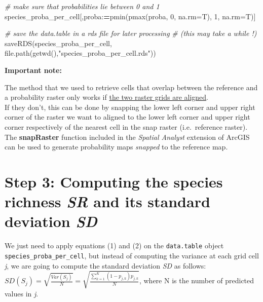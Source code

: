 \documentclass[
]{article}
\newenvironment{Shaded}{\begin{snugshade}}{\end{snugshade}}
\newcommand{\AttributeTok}[1]{\textcolor[rgb]{0.77,0.63,0.00}{#1}}
\newcommand{\CommentTok}[1]{\textcolor[rgb]{0.56,0.35,0.01}{\textit{#1}}}
\newcommand{\DecValTok}[1]{\textcolor[rgb]{0.00,0.00,0.81}{#1}}
\newcommand{\ErrorTok}[1]{\textcolor[rgb]{0.64,0.00,0.00}{\textbf{#1}}}
\newcommand{\FunctionTok}[1]{\textcolor[rgb]{0.00,0.00,0.00}{#1}}
\newcommand{\NormalTok}[1]{#1}
\newcommand{\SpecialCharTok}[1]{\textcolor[rgb]{0.00,0.00,0.00}{#1}}
\newcommand{\StringTok}[1]{\textcolor[rgb]{0.31,0.60,0.02}{#1}}
\begin{document}
\begin{Shaded}
\begin{Highlighting}[]
\CommentTok{\# make sure that probabilities lie between 0 and 1}
\NormalTok{species\_proba\_per\_cell[,proba}\SpecialCharTok{:}\ErrorTok{=}\FunctionTok{pmin}\NormalTok{(}\FunctionTok{pmax}\NormalTok{(proba, }\DecValTok{0}\NormalTok{, }\AttributeTok{na.rm=}\NormalTok{T), }\DecValTok{1}\NormalTok{, }\AttributeTok{na.rm=}\NormalTok{T)]}

\CommentTok{\# save the data.table in a rds file for later processing}
\CommentTok{\# (this may take a while !)}
\FunctionTok{saveRDS}\NormalTok{(species\_proba\_per\_cell, }\FunctionTok{file.path}\NormalTok{(}\FunctionTok{getwd}\NormalTok{(),}\StringTok{"species\_proba\_per\_cell.rds"}\NormalTok{))}
\end{Highlighting}
\end{Shaded}

\begin{warningbox}
\textbf{Important note:}

The method that we used to retrieve cells that overlap between the
reference and a probability raster only works if
\underline{the two raster grids are aligned}.\\
If they don't, this can be done by snapping the lower left corner and
upper right corner of the raster we want to aligned to the lower left
corner and upper right corner respectively of the nearest cell in the
snap raster (i.e.~reference raster).\\
The \textbf{snapRaster} function included in the \emph{Spatial Analyst}
extension of ArcGIS can be used to generate probability maps
\emph{snapped} to the reference map.

\end{warningbox}

\hypertarget{step-3-computing-the-species-richness-sr-and-its-standard-deviation-sd}{%
\section{\texorpdfstring{Step 3: Computing the species richness
\emph{SR} and its standard deviation
\emph{SD}}{Step 3: Computing the species richness SR and its standard deviation SD}}\label{step-3-computing-the-species-richness-sr-and-its-standard-deviation-sd}}

We just need to apply equations (1) and (2) on the \texttt{data.table}
object \texttt{species\_proba\_per\_cell}, but instead of computing the
variance at each grid cell \emph{j}, we are going to compute the
standard deviation \emph{SD} as follows:
\(SD(S_j)=\sqrt{\frac{Var(S_j)}{N}}=\sqrt{\frac{\sum_{k=1}^K(1-p_{j,k})p_{j,k}}{N}}\),
where N is the number of predicted values in \emph{j}.
\end{document}
